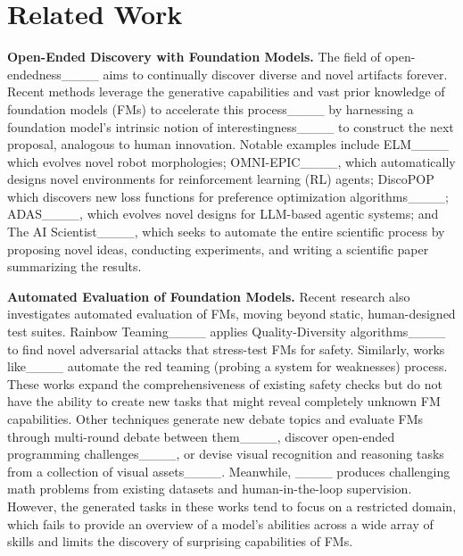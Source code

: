 \section{Related Work}
\label{sec:related}

\textbf{Open-Ended Discovery with Foundation Models.}
The field of open-endedness____ aims to continually discover diverse and novel artifacts forever.
Recent methods leverage the generative capabilities and vast prior knowledge of foundation models (FMs) to accelerate this process____ by harnessing a foundation model's intrinsic notion of interestingness____ to construct the next proposal, analogous to human innovation.
Notable examples include ELM____ which evolves novel robot morphologies; OMNI-EPIC____, which automatically designs novel environments for reinforcement learning (RL) agents; DiscoPOP which discovers new loss functions for preference optimization algorithms____; ADAS____, which evolves novel designs for LLM-based agentic systems; and The AI Scientist____, which seeks to automate the entire scientific process by proposing novel ideas, conducting experiments, and writing a scientific paper summarizing the results.

\textbf{Automated Evaluation of Foundation Models.} Recent research also investigates automated evaluation of FMs, moving beyond static, human-designed test suites.
Rainbow Teaming____ applies Quality-Diversity algorithms____ to find novel adversarial attacks that stress-test FMs for safety.
Similarly, works like____ automate the red teaming (probing a system for weaknesses) process.
These works expand the comprehensiveness of existing safety checks but do not have the ability to create new tasks that might reveal completely unknown FM capabilities.
Other techniques generate new debate topics and evaluate FMs through multi-round debate between them____, discover open-ended programming challenges____, or devise visual recognition and reasoning tasks from a collection of visual assets____.
Meanwhile, ____ produces challenging math problems from existing datasets and human-in-the-loop supervision.
However, the generated tasks in these works tend to focus on a restricted domain, which fails to provide an overview of a model's abilities across a wide array of skills and limits the discovery of surprising capabilities of FMs.